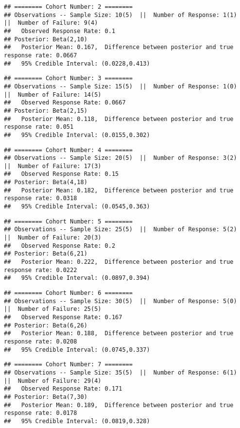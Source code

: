 \documentclass[]{article}
\begin{document}
\begin{verbatim}
## ======== Cohort Number: 2 ======== 
## Observations -- Sample Size: 10(5)  ||  Number of Response: 1(1)  ||  Number of Failure: 9(4)
##   Observed Response Rate: 0.1
## Posterior: Beta(2,10) 
##   Posterior Mean: 0.167,  Difference between posterior and true response rate: 0.0667
##   95% Credible Interval: (0.0228,0.413)
\end{verbatim}

\begin{verbatim}
## ======== Cohort Number: 3 ======== 
## Observations -- Sample Size: 15(5)  ||  Number of Response: 1(0)  ||  Number of Failure: 14(5)
##   Observed Response Rate: 0.0667
## Posterior: Beta(2,15) 
##   Posterior Mean: 0.118,  Difference between posterior and true response rate: 0.051
##   95% Credible Interval: (0.0155,0.302)
\end{verbatim}

\begin{verbatim}
## ======== Cohort Number: 4 ======== 
## Observations -- Sample Size: 20(5)  ||  Number of Response: 3(2)  ||  Number of Failure: 17(3)
##   Observed Response Rate: 0.15
## Posterior: Beta(4,18) 
##   Posterior Mean: 0.182,  Difference between posterior and true response rate: 0.0318
##   95% Credible Interval: (0.0545,0.363)
\end{verbatim}

\begin{verbatim}
## ======== Cohort Number: 5 ======== 
## Observations -- Sample Size: 25(5)  ||  Number of Response: 5(2)  ||  Number of Failure: 20(3)
##   Observed Response Rate: 0.2
## Posterior: Beta(6,21) 
##   Posterior Mean: 0.222,  Difference between posterior and true response rate: 0.0222
##   95% Credible Interval: (0.0897,0.394)
\end{verbatim}

\begin{verbatim}
## ======== Cohort Number: 6 ======== 
## Observations -- Sample Size: 30(5)  ||  Number of Response: 5(0)  ||  Number of Failure: 25(5)
##   Observed Response Rate: 0.167
## Posterior: Beta(6,26) 
##   Posterior Mean: 0.188,  Difference between posterior and true response rate: 0.0208
##   95% Credible Interval: (0.0745,0.337)
\end{verbatim}

\begin{verbatim}
## ======== Cohort Number: 7 ======== 
## Observations -- Sample Size: 35(5)  ||  Number of Response: 6(1)  ||  Number of Failure: 29(4)
##   Observed Response Rate: 0.171
## Posterior: Beta(7,30) 
##   Posterior Mean: 0.189,  Difference between posterior and true response rate: 0.0178
##   95% Credible Interval: (0.0819,0.328)
\end{verbatim}
\end{document}
